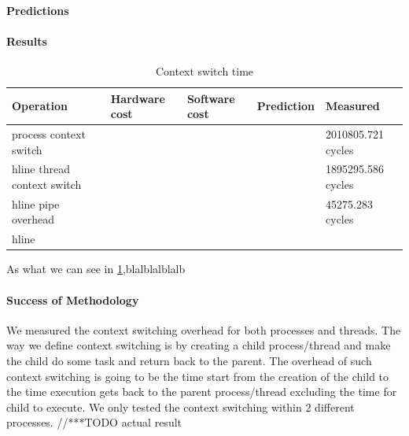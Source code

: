 \paragraph{Predictions}
\paragraph{Results}
\begin{table}
\begin{center}
\begin{tabular}{| l | l | l | l | l |}
\hline
Operation 				& Hardware cost 	& Software cost 	& Prediction 	& Measured \\ \hline
process context switch 	& 				&				&			& 2010805.721 cycles \\hline
thread context switch 	& 				&				&			& 1895295.586 cycles \\hline
pipe overhead			& 				&				&			& 45275.283 cycles \\hline
\hline
\end{tabular}
\end{center}

\caption{Context switch time\label{tab:context-switch-time}}
\end{table}
As what we can see in \ref{tab:context-switch-time},blalblalblalb

\paragraph{Success of Methodology}
We measured the context switching overhead for both processes and threads. The way we define context switching is by creating a child process/thread and make the child do some task and return back to the parent. The overhead of such context switching is going to be the time start from the creation of the child to the time execution gets back to the parent process/thread excluding the time for child to execute. We only tested the context switching within 2 different processes.
//***TODO actual result

